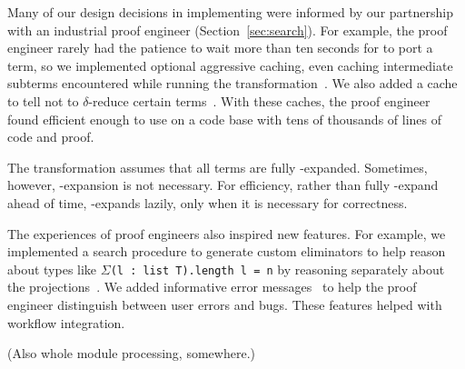 Many of our design decisions in implementing \toolnamec were informed by our partnership with
an industrial proof engineer (Section~\ref{sec:search}).
For example, the proof engineer rarely had the patience to wait more than ten seconds
for \toolnamec to port a term,
so we implemented optional aggressive caching, even caching intermediate subterms
encountered while running the transformation~\href{https://github.com/uwplse/pumpkin-pi/blob/v2.0.0/plugin/src/cache/caching.ml}{}. %
We also added a cache to tell \toolnamec not to $\delta$-reduce certain terms~\href{https://github.com/uwplse/pumpkin-pi/blob/v2.0.0/plugin/src/cache/caching.ml}{}.
With these caches, the proof engineer found \toolnamec efficient enough to use on a code base with tens of thousands of lines of code and proof.


The transformation assumes that all terms are fully \smallmath{$\eta$}-expanded. Sometimes,
however, \smallmath{$\eta$}-expansion is not necessary.
For efficiency, rather than fully \smallmath{$\eta$}-expand ahead of time, \toolnamec \smallmath{$\eta$}-expands lazily, 
only when it is necessary for correctness.

The experiences of proof engineers also inspired new features.
For example, we implemented a search procedure to generate custom eliminators %
to help reason about types like $\Sigma$\lstinline{(l : list T).length l = n}
by reasoning separately about the projections~\href{https://github.com/uwplse/pumpkin-pi/blob/v2.0.0/plugin/src/automation/search/smartelim.ml}{}. %
We added informative error messages~\href{https://github.com/uwplse/pumpkin-pi/blob/v2.0.0/plugin/src/lib/ornerrors.ml}{} to help the proof engineer distinguish between user errors and bugs. %
These features helped with workflow integration. %

(Also whole module processing, somewhere.)



